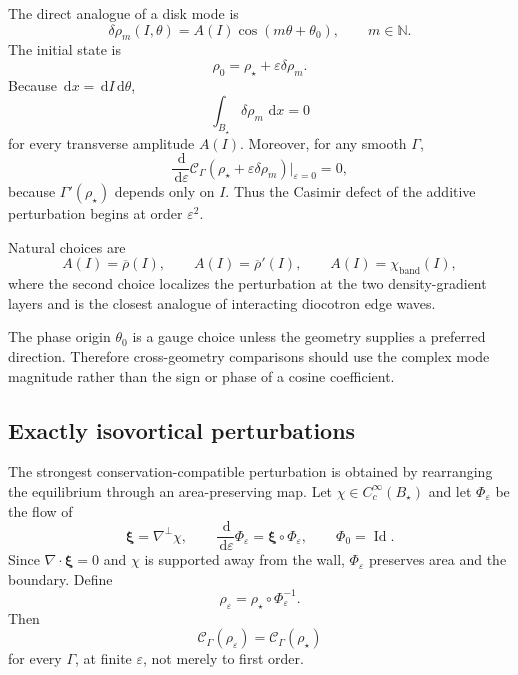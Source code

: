 \documentclass[11pt,a4paper]{article}
\newcommand{\dd}{\,\mathrm{d}}
\begin{document}
The direct analogue of a disk mode is
\begin{equation}
  \delta\rho_m(I,\theta)
  =A(I)\cos(m\theta+\theta_0),
  \qquad m\in\mathbb{N}.
  \label{eq:additive-mode}
\end{equation}
The initial state is
\begin{equation}
  \rho_0=\rho_\star+\varepsilon\delta\rho_m.
  \label{eq:additive-initial-state}
\end{equation}
Because $\dd x=\dd I\dd\theta$,
\begin{equation}
  \int_{B_\star}\delta\rho_m\,\dd x=0
  \label{eq:exact-zero-mass}
\end{equation}
for every transverse amplitude $A(I)$. Moreover, for any smooth $\Gamma$,
\[
  \frac{\dd}{\dd\varepsilon}
  \mathcal{C}_\Gamma(\rho_\star+\varepsilon\delta\rho_m)
  \bigg|_{\varepsilon=0}
  =0,
\]
because $\Gamma'(\rho_\star)$ depends only on $I$. Thus the Casimir defect of the additive perturbation begins at order $\varepsilon^2$.

Natural choices are
\begin{equation}
  A(I)=\overline\rho(I),
  \qquad
  A(I)=\overline\rho'(I),
  \qquad
  A(I)=\chi_{\mathrm{band}}(I),
  \label{eq:amplitude-choices}
\end{equation}
where the second choice localizes the perturbation at the two density-gradient layers and is the closest analogue of interacting diocotron edge waves.

The phase origin $\theta_0$ is a gauge choice unless the geometry supplies a preferred direction. Therefore cross-geometry comparisons should use the complex mode magnitude rather than the sign or phase of a cosine coefficient.

\subsection{Exactly isovortical perturbations}

The strongest conservation-compatible perturbation is obtained by rearranging the equilibrium through an area-preserving map. Let $\chi\in C_c^\infty(B_\star)$ and let $\Phi_\varepsilon$ be the flow of
\begin{equation}
  \boldsymbol\xi=\nabla^\perp\chi,
  \qquad
  \frac{\dd}{\dd\varepsilon}\Phi_\varepsilon
  =\boldsymbol\xi\circ\Phi_\varepsilon,
  \qquad
  \Phi_0=\operatorname{Id}.
  \label{eq:area-preserving-flow}
\end{equation}
Since $\nabla\cdot\boldsymbol\xi=0$ and $\chi$ is supported away from the wall, $\Phi_\varepsilon$ preserves area and the boundary. Define
\begin{equation}
  \rho_\varepsilon
  =\rho_\star\circ\Phi_\varepsilon^{-1}.
  \label{eq:isovortical-state}
\end{equation}
Then
\begin{equation}
  \mathcal{C}_\Gamma(\rho_\varepsilon)
  =\mathcal{C}_\Gamma(\rho_\star)
  \label{eq:exact-casimir-preservation}
\end{equation}
for every $\Gamma$, at finite $\varepsilon$, not merely to first order.
\end{document}
